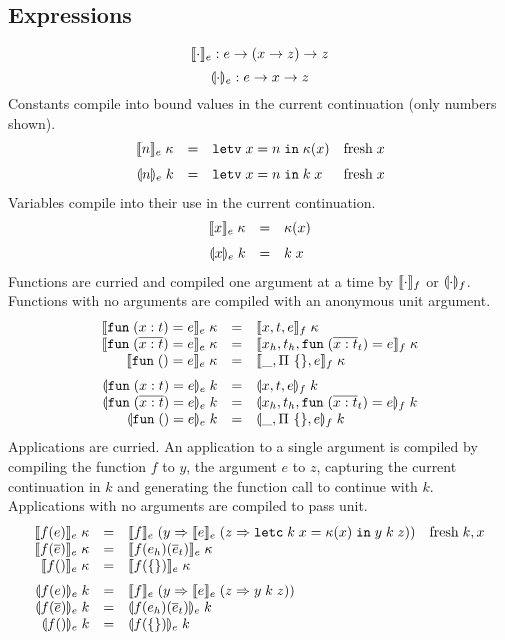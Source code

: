 \documentclass[11pt]{article}
\begin{document}
\subsection*{Expressions}

\[
    \llbracket \cdot \rrbracket_e : e -> (x -> z) -> z
\]
\[
    \llparenthesis \cdot \rrparenthesis_e : e -> x -> z
\]
Constants compile into bound values in the current continuation (only numbers shown).
\[
\begin{array}{rcll}
\cmpk{e}{\nume{n}} & = &
  \letv{x}{n}{\kappa(x)}   & \fresh{x} \medskip \\

\tcmpk{e}{\nume{n}} & = &
  \letv{x}{n}{\appc{k}{x}} & \fresh{x} \\
\end{array}
\]
Variables compile into their use in the current continuation.
\[
\begin{array}{rcll}
\cmpk{e}{\vare{x}} & = &
  \kappa(x) \medskip \\

\tcmpk{e}{\vare{x}} & = &
  \appc{k}{x} \\
\end{array}
\]
Functions are curried and compiled one argument at a time by $\llbracket \cdot \rrbracket_f$ or $\llparenthesis \cdot \rrparenthesis_f$.
Functions with no arguments are compiled with an anonymous unit argument.
\[
\begin{array}{rcll}
\cmpk{e}{\fune{\arge{x}{t}}{e}} & = &
  \cmpk{f}{x,t,e}
  \\
\cmpk{e}{\fune{\repo{\arge{x}{t}}}{e}} & = &
  \cmpk{f}{x_h,t_h,\fune{\repo{\arge{x}{t}}_t}{e}}
  \\
\cmpk{e}{\fune{}{e}} & = &
  \cmpk{f}{\_,\unitty,e} \medskip
  \\
\tcmpk{e}{\fune{\arge{x}{t}}{e}} & = &
  \tcmpk{f}{x,t,e}
  \\
\tcmpk{e}{\fune{\repo{\arge{x}{t}}}{e}} & = &
  \tcmpk{f}{x_h,t_h,\fune{\repo{\arge{x}{t}}_t}{e}}
  \\
\tcmpk{e}{\fune{}{e}} & = &
  \tcmpk{f}{\_,\unitty,e}
  \\
\end{array}
\]
Applications are curried.
An application to a single argument is compiled by compiling the function $f$ to $y$, the argument $e$ to $z$, capturing the current continuation in $k$ and generating the function call to continue with $k$.
Applications with no arguments are compiled to pass unit.
\[
\begin{array}{rcll}
\cmpk{e}{\appe{f}{e}} & = &
  \cmpin{e}{f}{(y => \cmpin{e}{e}{(z => \letc{k}{x}{\kappa(x)}{\appf{y}{k}{z}})})} &
  \fresh{k,x} \\
\cmpk{e}{\appe{f}{\repo{e}}} & = &
  \cmpk{e}{\appe{\appe{f}{e_h}}{\repo{e}_t}} \\
\cmpk{e}{\appe{f}{}} & = &
  \cmpk{e}{\appe{f}{\unit}} \medskip
  \\
\tcmpk{e}{\appe{f}{e}} & = &
  \cmpin{e}{f}{(y => \cmpin{e}{e}{(z => \appf{y}{k}{z})})} \\
\tcmpk{e}{\appe{f}{\repo{e}}} & = &
  \tcmpk{e}{\appe{\appe{f}{e_h}}{\repo{e}_t}} \\
\tcmpk{e}{\appe{f}{}} & = &
  \tcmpk{e}{\appe{f}{\unit}}
\end{array}
\]
\end{document}
